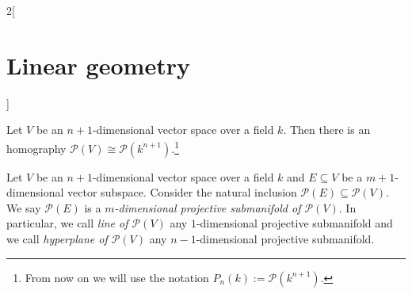 \documentclass[class=article,10pt,crop=false]{standalone}
\begin{document}
\begin{multicols}{2}[\section{Linear geometry}]
\begin{definition}
\end{definition}
\begin{prop}
Let $V$ be an $n+1$-dimensional vector space over a field $k$. Then there is an homography $\mathcal{P}(V)\cong \mathcal{P}(k^{n+1})$.\footnote{From now on we will use the notation $P_n(k):=\mathcal{P}(k^{n+1})$.}
\end{prop}
\begin{definition}
Let $V$ be an $n+1$-dimensional vector space over a field $k$ and $E\subseteq V$ be a $m+1$-dimensional vector subspace. Consider the natural inclusion $\mathcal{P}(E)\subseteq\mathcal{P}(V)$. We say $\mathcal{P}(E)$ is a \textit{$m$-dimensional projective submanifold of $\mathcal{P}(V)$}. In particular, we call \textit{line of $\mathcal{P}(V)$} any $1$-dimensional projective submanifold and we call \textit{hyperplane of $\mathcal{P}(V)$} any $n-1$-dimensional projective submanifold.
\end{definition}

\end{multicols}
\end{document}
